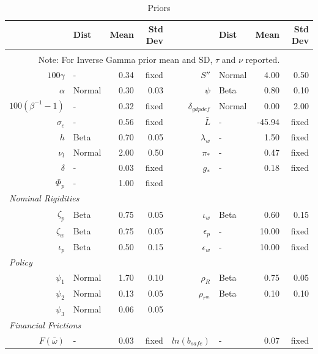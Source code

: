 \documentclass[12pt]{article}
\begin{document}
\pagestyle{empty}
\renewcommand*\footnoterule{}\vspace*{.5cm}
{\small
\begin{longtable}{rlrr@{\hspace{1in}}rlrr}
\caption{Priors}
\label{tab:param-priors}
\\ \hline
& Dist & Mean & Std Dev & & Dist & Mean & Std Dev \\ \hline
\endhead
\hline \\
\multicolumn{8}{c}{\footnotesize Note: For Inverse Gamma prior mean and SD, $\tau$ and $\nu$ reported.}
\endfoot
\multicolumn{8}{l}{\textit{Steady State}} \\[3pt]
$100\gamma$ & - & 0.34 & \scriptsize{fixed} & $S''$ & Normal & 4.00 & 0.50 \\
$\alpha$ & Normal & 0.30 & 0.03 & $\psi$ & Beta & 0.80 & 0.10 \\
$100(\beta^{-1} - 1)$ & - & 0.32 & \scriptsize{fixed} & $\delta_{gdpdef}$ & Normal & 0.00 & 2.00 \\
$\sigma_{c}$ & - & 0.56 & \scriptsize{fixed} & $\bar{L}$ & - & -45.94 & \scriptsize{fixed} \\
$h$ & Beta & 0.70 & 0.05 & $\lambda_w$ & - & 1.50 & \scriptsize{fixed} \\
$\nu_l$ & Normal & 2.00 & 0.50 & $\pi_*$ & - & 0.47 & \scriptsize{fixed} \\
$\delta$ & - & 0.03 & \scriptsize{fixed} & $g_*$ & - & 0.18 & \scriptsize{fixed} \\
$\Phi_p$ & - & 1.00 & \scriptsize{fixed} && & & \\[3pt]
\multicolumn{8}{l}{\textit{Nominal Rigidities}} \\[3pt]
$\zeta_p$ & Beta & 0.75 & 0.05 & $\iota_w$ & Beta & 0.60 & 0.15 \\
$\zeta_w$ & Beta & 0.75 & 0.05 & $\epsilon_{p}$ & - & 10.00 & \scriptsize{fixed} \\
$\iota_p$ & Beta & 0.50 & 0.15 & $\epsilon_{w}$ & - & 10.00 & \scriptsize{fixed} \\[3pt]
\multicolumn{8}{l}{\textit{Policy}} \\[3pt]
$\psi_1$ & Normal & 1.70 & 0.10 & $\rho_R$ & Beta & 0.75 & 0.05 \\
$\psi_2$ & Normal & 0.13 & 0.05 & $\rho_{r^m}$ & Beta & 0.10 & 0.10 \\
$\psi_3$ & Normal & 0.06 & 0.05 && & & \\[3pt]
\multicolumn{8}{l}{\textit{Financial Frictions}} \\[3pt]
$F(\bar{\omega})$ & - & 0.03 & \scriptsize{fixed} & $ln(b_{safe})$ & - & 0.07 & \scriptsize{fixed} \\

\end{longtable}}
\end{document}
